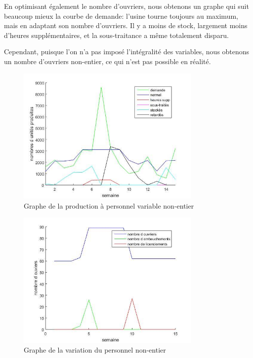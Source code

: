 En optimisant également le nombre d'ouvriers, nous obtenons un graphe qui suit beaucoup mieux la courbe de demande: l'usine tourne toujours au maximum, mais en adaptant son nombre d'ouvriers. Il y a moins de stock, largement moins d'heures supplémentaires, et la sous-traitance a même totalement disparu.

Cependant, puisque l'on n'a pas imposé l'intégralité des variables, nous obtenons un nombre d'ouvriers non-entier, ce qui n'est pas possible en réalité.

\begin{figure}[H]
    \centering
    \includegraphics[width=0.8\textwidth]{graphes/q8_01.jpg}
    \caption{Graphe de la production à personnel variable non-entier}
    \label{fig:q8_01}
\end{figure}

\begin{figure}[H]
    \centering
    \includegraphics[width=0.8\textwidth]{graphes/q8_02.jpg}
    \caption{Graphe de la variation du personnel non-entier}
    \label{fig:q8_02}
\end{figure}
